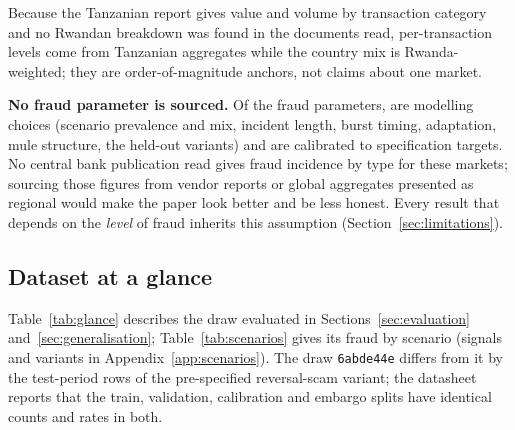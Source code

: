 Because the Tanzanian report gives value and volume by transaction category and no Rwandan
breakdown was found in the documents read, per-transaction levels come from Tanzanian aggregates while the country mix is Rwanda-weighted;
they are order-of-magnitude anchors, not claims about one market.

\textbf{No fraud parameter is sourced.} Of the \nProvFraudTotal{} fraud parameters,
\nProvFraudAssumed{} are modelling choices (scenario prevalence and mix, incident length, burst
timing, adaptation, mule structure, the held-out variants) and \nProvFraudCalibrated{} are
calibrated to specification targets. No central bank publication read gives fraud incidence by
type for these markets; sourcing those figures from vendor reports or global aggregates presented
as regional would make the paper look better and be less honest. Every result that depends on the
\emph{level} of fraud inherits this assumption (Section~\ref{sec:limitations}).

\subsection{Dataset at a glance}

Table~\ref{tab:glance} describes the draw evaluated in Sections~\ref{sec:evaluation}
and~\ref{sec:generalisation}; Table~\ref{tab:scenarios} gives its fraud by scenario
(signals and variants in Appendix~\ref{app:scenarios}). The draw
\texttt{6abde44e} differs from it by the \nRevRows{} test-period rows of the pre-specified
reversal-scam variant; the datasheet reports that the train, validation, calibration and embargo
splits have identical counts and rates in both.

